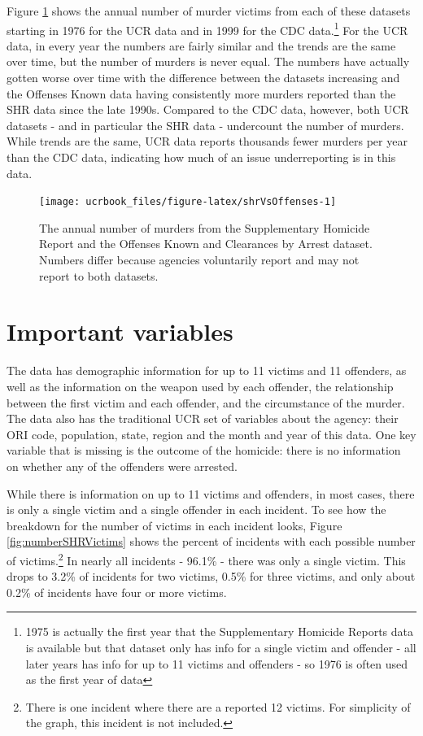 \documentclass[
  12pt,
  openany]{book}
\begin{document}
Figure \ref{fig:shrVsOffenses} shows the annual number of murder victims from each of these datasets starting in 1976 for the UCR data and in 1999 for the CDC data.\footnote{1975 is actually the first year that the Supplementary Homicide Reports data is available but that dataset only has info for a single victim and offender - all later years has info for up to 11 victims and offenders - so 1976 is often used as the first year of data} For the UCR data, in every year the numbers are fairly similar and the trends are the same over time, but the number of murders is never equal. The numbers have actually gotten worse over time with the difference between the datasets increasing and the Offenses Known data having consistently more murders reported than the SHR data since the late 1990s. Compared to the CDC data, however, both UCR datasets - and in particular the SHR data - undercount the number of murders. While trends are the same, UCR data reports thousands fewer murders per year than the CDC data, indicating how much of an issue underreporting is in this data.

\begin{figure}

{\centering \texttt{[image: ucrbook\_files/figure-latex/shrVsOffenses-1]} 

}

\caption{The annual number of murders from the Supplementary Homicide Report and the Offenses Known and Clearances by Arrest dataset. Numbers differ because agencies voluntarily report and may not report to both datasets.}\label{fig:shrVsOffenses}
\end{figure}

\hypertarget{important-variables-3}{%
\section{Important variables}\label{important-variables-3}}

The data has demographic information for up to 11 victims and 11 offenders, as well as the information on the weapon used by each offender, the relationship between the first victim and each offender, and the circumstance of the murder. The data also has the traditional UCR set of variables about the agency: their ORI code, population, state, region and the month and year of this data. One key variable that is missing is the outcome of the homicide: there is no information on whether any of the offenders were arrested.

While there is information on up to 11 victims and offenders, in most cases, there is only a single victim and a single offender in each incident. To see how the breakdown for the number of victims in each incident looks, Figure \ref{fig:numberSHRVictims} shows the percent of incidents with each possible number of victims.\footnote{There is one incident where there are a reported 12 victims. For simplicity of the graph, this incident is not included.} In nearly all incidents - 96.1\% - there was only a single victim. This drops to 3.2\% of incidents for two victims, 0.5\% for three victims, and only about 0.2\% of incidents have four or more victims.
\end{document}
